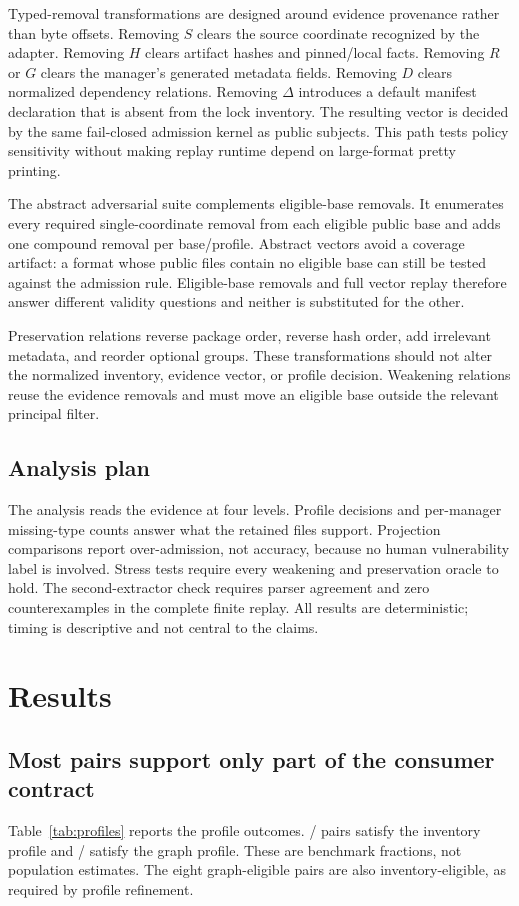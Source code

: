 \documentclass[10pt,conference]{IEEEtran}
\begin{document}
Typed-removal transformations are designed around evidence provenance rather than byte offsets. Removing $S$ clears the source coordinate recognized by the adapter. Removing $H$ clears artifact hashes and pinned/local facts. Removing $R$ or $G$ clears the manager's generated metadata fields. Removing $D$ clears normalized dependency relations. Removing $\Delta$ introduces a default manifest declaration that is absent from the lock inventory. The resulting vector is decided by the same fail-closed admission kernel as public subjects. This path tests policy sensitivity without making replay runtime depend on large-format pretty printing.

The abstract adversarial suite complements eligible-base removals. It enumerates every required single-coordinate removal from each eligible public base and adds one compound removal per base/profile. Abstract vectors avoid a coverage artifact: a format whose public files contain no eligible base can still be tested against the admission rule. Eligible-base removals and full vector replay therefore answer different validity questions and neither is substituted for the other.

Preservation relations reverse package order, reverse hash order, add irrelevant metadata, and reorder optional groups. These transformations should not alter the normalized inventory, evidence vector, or profile decision. Weakening relations reuse the evidence removals and must move an eligible base outside the relevant principal filter.

\subsection{Analysis plan}
The analysis reads the evidence at four levels. Profile decisions and per-manager missing-type counts answer what the retained files support. Projection comparisons report over-admission, not accuracy, because no human vulnerability label is involved. Stress tests require every weakening and preservation oracle to hold. The second-extractor check requires parser agreement and zero counterexamples in the complete finite replay. All results are deterministic; timing is descriptive and not central to the claims.

\section{Results}
\subsection{Most pairs support only part of the consumer contract}
Table~\ref{tab:profiles} reports the profile outcomes. \InventoryEligible{}/\SubjectCount{} pairs satisfy the inventory profile and \GraphEligible{}/\SubjectCount{} satisfy the graph profile. These are benchmark fractions, not population estimates. The eight graph-eligible pairs are also inventory-eligible, as required by profile refinement.
\end{document}
